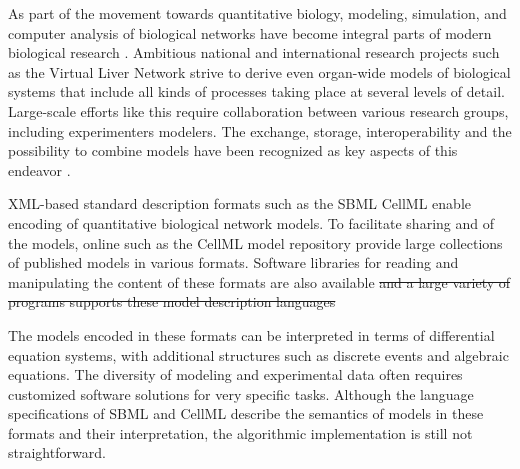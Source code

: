 \documentclass[10pt]{bmc_article}
\newenvironment{bmcformat}{\fussy\setboolean{publ}{true}}{\fussy}
\begin{document}
\begin{bmcformat}
As part of the movement towards quantitative biology,  modeling, 
simulation, and computer analysis of biological networks have become integral
parts of modern biological research \cite{Macilwain2011}.
Ambitious national and international research projects such as the Virtual Liver
Network \cite{Holzhuetter2012} strive to derive even organ-wide models of
biological systems that include all kinds of processes taking place at several
levels of detail.
Large-scale efforts like this require  collaboration between various
research groups, including experimenters\COR{,} modelers.
The exchange, storage, interoperability\COR{,} and the possibility to combine models have been recognized as
key aspects of this endeavor \cite{Schulz2006, Klipp2007, Chelliah2009, Liebermeister2009sta}.

XML-based standard description formats %
such as the \acf{SBML} \cite{Hucka2004, SBML2013}  CellML \cite{Lloyd2004, CellML2013}
enable encoding of quantitative biological network models.
To facilitate sharing and  of the models, online  such as
 \cite{Li2010a}  the CellML model repository
\cite{Lloyd2008} provide large collections of published models in various
formats.
Software libraries for reading and manipulating the content
of these formats are also available \cite{Bornstein2008, Miller2010,
Draeger2011b}
\sout{and a large variety of programs supports these model description languages}

The models encoded in these formats can be interpreted in terms of 
differential equation systems, with additional structures such as
discrete events and algebraic equations.
The diversity of modeling  and experimental data often requires
customized software solutions for very specific tasks.
Although the language specifications of \acs{SBML} \cite{Hucka2001, Hucka2003,
Finney2003a, Finney2006, Hucka2007, Hucka2008, Hucka2010a} 
and CellML \cite{Cuellar2006} describe the semantics of models in these formats
and their interpretation, the algorithmic implementation is still not
straightforward.


\end{bmcformat}
\end{document}
